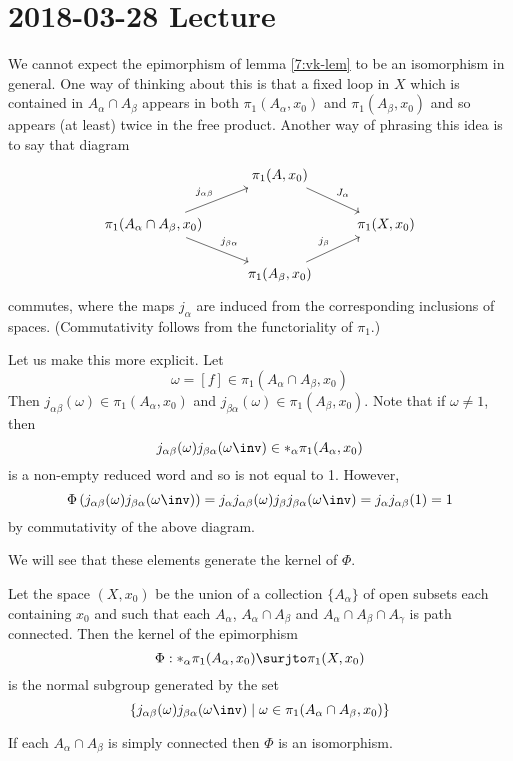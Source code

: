 \section{2018-03-28 Lecture}

We cannot expect the epimorphism of lemma \ref{7:vk-lem} to be an isomorphism in general.
One way of thinking about this is that a fixed loop in $X$ which is contained in $A_\alpha \cap A_\beta$ appears in both $\pi_1(A_\alpha,x_0)$ and $\pi_1(A_\beta,x_0)$ and so appears (at least) twice in the free product.
Another way of phrasing this idea is to say that diagram
\[
\begin{tikzcd}
	& \pi_1(A,x_0) \ar[dr, "J_\alpha"] & \\
	\pi_1(A_\alpha \cap A_\beta, x_0) \ar[ur, "j_{\alpha\beta}"] \ar[dr, "j_{\beta\alpha}"] & & \pi_1(X,x_0) \\
	& \pi_1(A_\beta,x_0) \ar[ur, "j_\beta"] &
\end{tikzcd}
\]
commutes, where the maps $j_\alpha$ are induced from the corresponding inclusions of spaces.
(Commutativity follows from the functoriality of $\pi_1$.)

Let us make this more explicit.
Let
\[\omega = [f] \in \pi_1(A_\alpha \cap A_\beta,x_0)\]
Then $j_{\alpha\beta}(\omega) \in \pi_1(A_\alpha,x_0)$ and $j_{\beta\alpha}(\omega) \in \pi_1(A_\beta,x_0)$.
Note that if $\omega \neq 1$, then
\[j_{\alpha\beta}(\omega)j_{\beta\alpha}(\omega\inv) \in *_\alpha \pi_1(A_\alpha,x_0)\]
is a non-empty reduced word and so is not equal to 1.
However,
\[\Phi\left(j_{\alpha\beta}(\omega)j_{\beta\alpha}(\omega\inv)\right) = j_\alpha j_{\alpha\beta}(\omega) j_\beta j_{\beta\alpha}(\omega\inv) = j_\alpha j_{\alpha\beta}(1) = 1\]
by commutativity of the above diagram.

We will see that these elements generate the kernel of $\Phi$.

\begin{thm}
	Let the space $(X,x_0)$ be the union of a collection $\{A_\alpha\}$ of open subsets each containing $x_0$ and such that each $A_\alpha$, $A_\alpha \cap A_\beta$ and $A_\alpha \cap A_\beta \cap A_\gamma$ is path connected.
	Then the kernel of the epimorphism
	\[\Phi: *_\alpha \pi_1(A_\alpha,x_0) \surjto \pi_1(X,x_0)\]
	is the normal subgroup generated by the set
	\[\left\{ j_{\alpha\beta}(\omega)j_{\beta\alpha}(\omega\inv) \mid \omega \in \pi_1(A_\alpha\cap A_\beta,x_0)\right\}\]	
\end{thm}

\begin{rmk}
	If each $A_\alpha \cap A_\beta$ is simply connected then $\Phi$ is an isomorphism.
\end{rmk}


